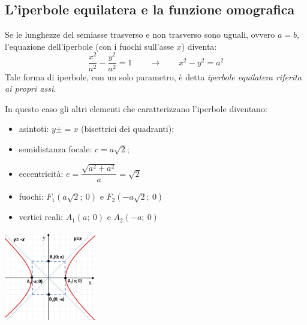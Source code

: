 \subsection{L'iperbole equilatera e la funzione omografica}
\label{subsec:iperbole_omografica}

Se le lunghezze del semiasse trasverso e non trasverso sono uguali, ovvero 
\(a=b\), 
l'equazione dell'iperbole (con i fuochi sull'asse \(x\)) diventa: 
\begin{equation*}
\dfrac{x^{2}}{a^{2}}-\dfrac{y^{2}}{a^{2}}=1 \qquad \longrightarrow \qquad
x^{2}-y^{2} =  a^{2} 
\end{equation*}
Tale forma di iperbole, con un solo parametro, è detta 
\emph{iperbole equilatera riferita ai propri assi}.

  \noindent\begin{minipage}[c]{.65\textwidth} 
In questo caso gli altri elementi che caratterizzano l'iperbole diventano:
  \begin{itemize} [nosep]
    \item asintoti: \(y\pm=x\) (bisettrici dei quadranti);
    \item semidistanza focale: \(c=a \sqrt{2} \);
    \item eccentricità: \(e = \dfrac{\sqrt{a^{2}+a^{2}}}{a}=\sqrt{2} \)
    \item fuochi: \( F_{1} \left(a \sqrt{2};~0\right)\) e 
                        \( F_{2}\left(-a \sqrt{2};~0\right)\)
    \item vertici reali: \( A_{1}(a;~0)\) e \(A_{2}(-a;~0)\)
  \end{itemize}    
  \end{minipage}
  \hfill
  \begin{minipage}[c]{.3\textwidth}
    \includegraphics[height=4cm, width=4cm,]{img/equilatera.jpg}
  \end{minipage}

